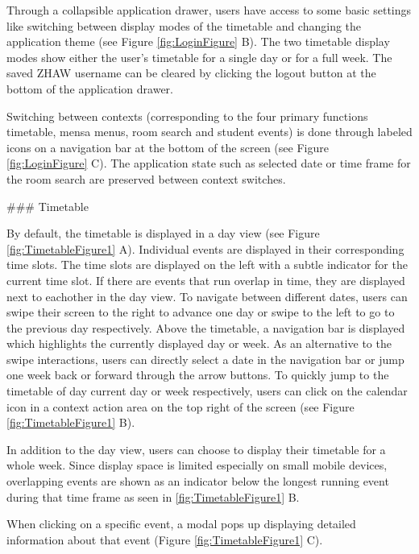\begin{markdown}
Through a collapsible application drawer, users have access to some basic settings like switching between display modes of the timetable and changing the application theme (see Figure \ref{fig:LoginFigure} B). The two timetable display modes show either the user's timetable for a single day or for a full week. The saved ZHAW username can be cleared by clicking the logout button at the bottom of the application drawer.

Switching between contexts (corresponding to the four primary functions timetable, mensa menus, room search and student events) is done through labeled icons on a navigation bar at the bottom of the screen (see Figure \ref{fig:LoginFigure} C). The application state such as selected date or time frame for the room search are preserved between context switches.

### Timetable

By default, the timetable is displayed in a day view (see Figure \ref{fig:TimetableFigure1} A). Individual events are displayed in their corresponding time slots. The time slots are displayed on the left with a subtle indicator for the current time slot. If there are events that run overlap in time, they are displayed next to eachother in the day view. To navigate between different dates, users can swipe their screen to the right to advance one day or swipe to the left to go to the previous day respectively. Above the timetable, a navigation bar is displayed which highlights the currently displayed day or week. As an alternative to the swipe interactions, users can directly select a date in the navigation bar or jump one week back or forward through the arrow buttons. To quickly jump to the timetable of day current day or week respectively, users can click on the calendar icon in a context action area on the top right of the screen (see Figure \ref{fig:TimetableFigure1} B).

In addition to the day view, users can choose to display their timetable for a whole week. Since display space is limited especially on small mobile devices, overlapping events are shown as an indicator below the longest running event during that time frame as seen in \ref{fig:TimetableFigure1} B.

When clicking on a specific event, a modal pops up displaying detailed information about that event (Figure \ref{fig:TimetableFigure1} C).


\end{markdown}

